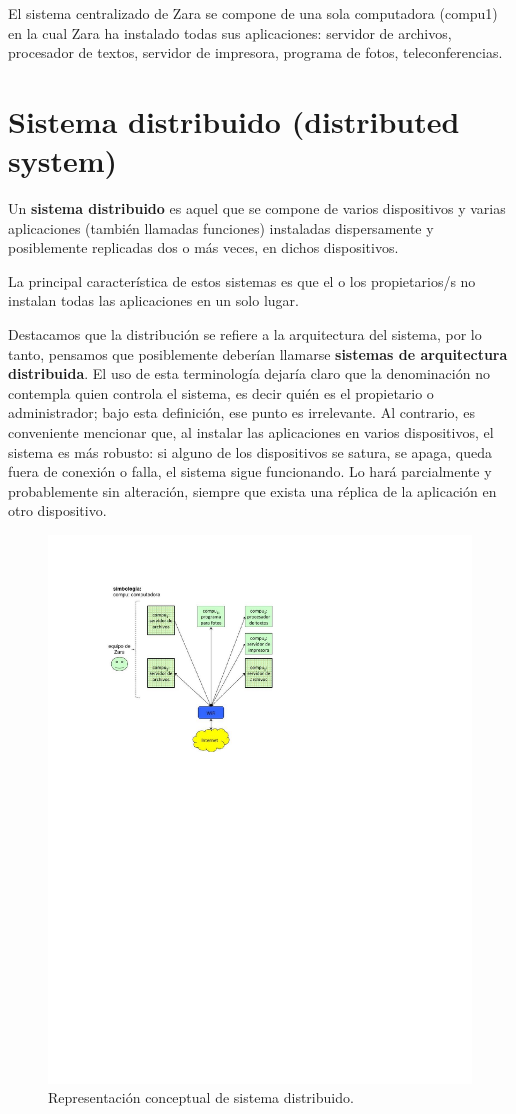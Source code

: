 \documentclass[12pt]{report} %
\begin{document}
El sistema centralizado de Zara se compone de una sola computadora (compu1) en la cual Zara ha instalado todas sus aplicaciones: servidor de archivos, procesador de textos, servidor de impresora, programa de fotos, teleconferencias. 

\section{Sistema distribuido (distributed system)}

Un \textbf{sistema distribuido} es aquel que se compone de varios dispositivos y varias aplicaciones (también llamadas funciones) instaladas dispersamente y posiblemente replicadas dos o más veces, en dichos dispositivos. 

La principal característica de estos sistemas es que el o los propietarios/s no instalan todas las aplicaciones en un solo lugar.  

Destacamos que la distribución se refiere a la arquitectura del sistema, por lo tanto, pensamos que posiblemente deberían llamarse \textbf{sistemas de arquitectura distribuida}. El uso de esta terminología dejaría claro que la denominación no contempla quien controla el sistema, es decir quién es el propietario o administrador; bajo esta definición, ese punto es irrelevante. Al contrario, es conveniente mencionar que, al instalar las aplicaciones en varios dispositivos, el sistema es más robusto: si alguno de los dispositivos se satura, se apaga, queda fuera de conexión o falla, el sistema sigue funcionando. Lo hará parcialmente y probablemente sin alteración, siempre que exista una réplica de la aplicación en otro dispositivo.


\begin{figure}
\centering
\includegraphics[width=0.85\columnwidth]{imagenes/imagendesc2.pdf}
\caption{Representación conceptual de sistema distribuido.}
\label{imagendesc2}
\end{figure} 
\end{document}
